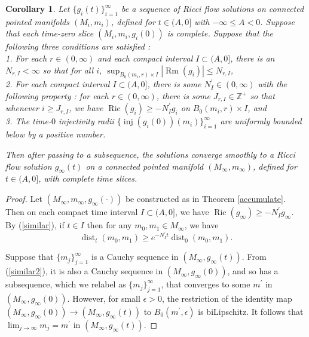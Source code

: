 \documentclass[12pt]{amsart}
\newcommand{\dist}{\operatorname{dist}}
\newcommand{\inj}{\operatorname{inj}}
\newcommand{\Ric}{\operatorname{Ric}}
\newcommand{\Rm}{\operatorname{Rm}}
\newcommand{\Z}{{\mathbb Z}}
\numberwithin{equation}{section}
\theoremstyle{plain}
\newtheorem{corollary}[equation]{Corollary}
\theoremstyle{definition}
\theoremstyle{remark}
\begin{document}
\begin{corollary}
\label{accumulate2}
Let $\{g_i(t)\}_{i=1}^\infty$ be a sequence of Ricci flow solutions
on connected pointed manifolds $(M_i, m_i)$, 
defined for $t \in (A, 0]$ with $-\infty \le A < 0$.
Suppose that each time-zero slice $(M_i, m_i, g_i(0))$ is complete.
Suppose that the following
three conditions are satisfied : \\
1. For each $r \in (0, \infty)$ and each compact interval $I \subset (A,0]$, 
there is an $N_{r,I} < \infty$ so that for all $i$,
$\sup_{B_0(m_i, r) \times I} |\Rm(g_i)| \le N_{r,I}$,  \\
2. For each compact interval $I \subset (A, 0]$, there  is some
$N^\prime_I \in (0, \infty)$ with the following property : for each 
$r \in (0, \infty)$, there is some $J_{r,I} \in \Z^+$ so that whenever
$i \ge J_{r,I}$, we have
$\Ric(g_i) \ge - N^\prime_I g_i$ on $B_0(m_i, r) \times I$, and \\
3. The
time-$0$ injectivity radii 
$\{\inj(g_i(0))(m_i)\}_{i=1}^\infty$ 
are uniformly bounded below by a positive number.

Then after passing to a subsequence, the solutions converge smoothly
to a
Ricci flow solution $g_\infty(t)$ on a connected pointed manifold
$(M_\infty, m_\infty)$, defined for
$t \in (A, 0]$, with complete time slices.
\end{corollary}
\begin{proof}
Let $(M_\infty, m_\infty, g_\infty(\cdot))$ be constructed as in Theorem
\ref{accumulate}. Then on each compact time interval $I \subset (A, 0]$, 
we have
$\Ric(g_\infty) \ge - N^\prime_I g_\infty$. By (\ref{similar}),
if $t \in I$ then for any $m_0, m_1 \in M_\infty$, we have 
\begin{equation} \label{similar2}
\dist_t(m_0, m_1) \ge e^{- N^\prime_I t} \dist_0(m_0, m_1).
\end{equation}

Suppose that $\{m_j\}_{j=1}^\infty$ is a Cauchy sequence
in $(M_\infty, g_\infty(t))$. From (\ref{similar2}), it is also
a Cauchy sequence in $(M_\infty, g_\infty(0))$, and so has a
subsequence, which we relabel as $\{m_j\}_{j=1}^\infty$, that
converges to some $m^\prime$ in $(M_\infty, g_\infty(0))$.
However, for small $\epsilon > 0$, the restriction of the
identity map $(M_\infty, g_\infty(0)) \rightarrow 
(M_\infty, g_\infty(t))$ to
$B_0(m^\prime, \epsilon)$ is biLipschitz.  It follows that
$\lim_{j \rightarrow \infty} m_j = m^\prime$ in
$(M_\infty, g_\infty(t))$.
\end{proof}
\end{document}
